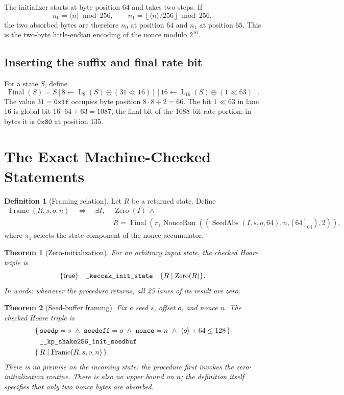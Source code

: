 \documentclass[11pt]{article}
\theoremstyle{definition}
\newtheorem{definition}{Definition}
\theoremstyle{plain}
\newtheorem{theorem}{Theorem}
\theoremstyle{remark}
\newcommand{\enc}[1]{\left[#1\right]_{64}}
\newcommand{\uint}[1]{\langle #1\rangle}
\newcommand{\Lane}{\operatorname{L}}
\newcommand{\SeedAbs}{\operatorname{SeedAbs}}
\newcommand{\NonceRun}{\operatorname{NonceRun}}
\newcommand{\Final}{\operatorname{Final}}
\newcommand{\Frame}{\operatorname{Frame}}
\begin{document}
The initializer starts at byte position $64$ and takes two steps.  If
\[
  n_0=\uint{n}\bmod256,
  \qquad
  n_1=\left\lfloor\uint{n}/256\right\rfloor\bmod256,
\]
the two absorbed bytes are therefore $n_0$ at position $64$ and $n_1$ at
position $65$.  This is the two-byte little-endian encoding of the nonce
modulo $2^{16}$.

\subsection{Inserting the suffix and final rate bit}

For a state $S$, define
\begin{equation}
\label{eq:final}
  \Final(S)
  =S[8\leftarrow \Lane_8(S)\oplus(31\ll16)]
     [16\leftarrow \Lane_{16}(S)\oplus(1\ll63)].
\end{equation}
The value $31=\mathtt{0x1f}$ occupies byte position
$8\cdot8+2=66$.  The bit $1\ll63$ in lane 16 is global bit
$16\cdot64+63=1087$, the final bit of the 1088-bit rate portion; in bytes it
is $\mathtt{0x80}$ at position $135$.

\section{The Exact Machine-Checked Statements}

\begin{definition}[Framing relation]
\label{def:frame}
Let $R$ be a returned state.  Define
\begin{align*}
  \Frame(R,s,o,n)
  \quad\Longleftrightarrow\quad
  \exists I,\;&\operatorname{Zero}(I)\ \land\\[-0.25em]
  &R=\Final\!\left(
      \pi_1\NonceRun\!\left(
        (\SeedAbs(I,s,o,64),n,\enc{64}),2
      \right)
    \right),
\end{align*}
where $\pi_1$ selects the state component of the nonce accumulator.
\end{definition}

\begin{theorem}[Zero-initialization]
\label{thm:zero}
For an arbitrary input state, the checked Hoare triple is
\[
  \{\mathsf{true}\}\quad
  \text{\texttt{\_keccak\_init\_state}}\quad
  \{R\mid\operatorname{Zero}(R)\}.
\]
In words: whenever the procedure returns, all 25 lanes of its result are zero.
\end{theorem}

\begin{theorem}[Seed-buffer framing]
\label{thm:frame}
Fix a seed $s$, offset $o$, and nonce $n$.  The checked Hoare triple is
\[
\begin{split}
  \{\,&\mathtt{seedp}=s\ \land\ \mathtt{seedoff}=o\ \land\
       \mathtt{nonce}=n\ \land\ \uint{o}+64\le128\,\}\\
  &\text{\texttt{\_\_kp\_shake256\_init\_seedbuf}}\\
  \{\,&R\mid\Frame(R,s,o,n)\,\}.
\end{split}
\]
There is no premise on the incoming state: the procedure first invokes the
zero-initialization routine.  There is also no upper bound on $n$; the
definition itself specifies that only two nonce bytes are absorbed.
\end{theorem}
\end{document}
